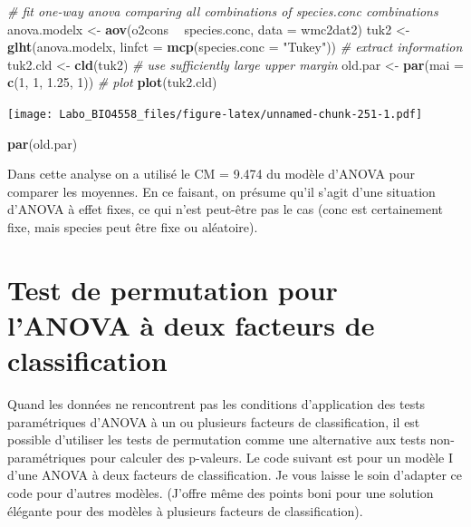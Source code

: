 \documentclass[12pt,]{book}
\newenvironment{Shaded}{\begin{snugshade}}{\end{snugshade}}
\newcommand{\CommentTok}[1]{\textcolor[rgb]{0.56,0.35,0.01}{\textit{#1}}}
\newcommand{\DataTypeTok}[1]{\textcolor[rgb]{0.13,0.29,0.53}{#1}}
\newcommand{\DecValTok}[1]{\textcolor[rgb]{0.00,0.00,0.81}{#1}}
\newcommand{\FloatTok}[1]{\textcolor[rgb]{0.00,0.00,0.81}{#1}}
\newcommand{\KeywordTok}[1]{\textcolor[rgb]{0.13,0.29,0.53}{\textbf{#1}}}
\newcommand{\NormalTok}[1]{#1}
\newcommand{\OperatorTok}[1]{\textcolor[rgb]{0.81,0.36,0.00}{\textbf{#1}}}
\newcommand{\StringTok}[1]{\textcolor[rgb]{0.31,0.60,0.02}{#1}}
\begin{document}
\begin{Shaded}
\begin{Highlighting}[]
\CommentTok{# fit one-way anova comparing all combinations of species.conc combinations}
\NormalTok{anova.modelx <-}\StringTok{ }\KeywordTok{aov}\NormalTok{(o2cons }\OperatorTok{~}\StringTok{ }\NormalTok{species.conc, }\DataTypeTok{data =}\NormalTok{ wmc2dat2)}
\NormalTok{tuk2 <-}\StringTok{ }\KeywordTok{glht}\NormalTok{(anova.modelx, }\DataTypeTok{linfct =} \KeywordTok{mcp}\NormalTok{(}\DataTypeTok{species.conc =} \StringTok{"Tukey"}\NormalTok{))}
\CommentTok{# extract information}
\NormalTok{tuk2.cld <-}\StringTok{ }\KeywordTok{cld}\NormalTok{(tuk2)}
\CommentTok{# use sufficiently large upper margin}
\NormalTok{old.par <-}\StringTok{ }\KeywordTok{par}\NormalTok{(}\DataTypeTok{mai =} \KeywordTok{c}\NormalTok{(}\DecValTok{1}\NormalTok{, }\DecValTok{1}\NormalTok{, }\FloatTok{1.25}\NormalTok{, }\DecValTok{1}\NormalTok{))}
\CommentTok{# plot}
\KeywordTok{plot}\NormalTok{(tuk2.cld)}
\end{Highlighting}
\end{Shaded}

\texttt{[image: Labo\_BIO4558\_files/figure-latex/unnamed-chunk-251-1.pdf]}

\begin{Shaded}
\begin{Highlighting}[]
\KeywordTok{par}\NormalTok{(old.par)}
\end{Highlighting}
\end{Shaded}

Dans cette analyse on a utilisé le CM = 9.474 du modèle d'ANOVA pour comparer les moyennes. En ce faisant, on présume qu'il s'agit d'une situation d'ANOVA à effet fixes, ce qui n'est peut-être pas le cas (conc est certainement fixe, mais species peut être fixe ou aléatoire).

\hypertarget{test-de-permutation-pour-lanova-uxe0-deux-facteurs-de-classification}{%
\section{Test de permutation pour l'ANOVA à deux facteurs de classification}\label{test-de-permutation-pour-lanova-uxe0-deux-facteurs-de-classification}}

Quand les données ne rencontrent pas les conditions d'application des tests paramétriques d'ANOVA à un ou plusieurs facteurs de classification, il est possible d'utiliser les tests de permutation comme une alternative aux tests non-paramétriques pour calculer des p-valeurs. Le code suivant est pour un modèle I d'une ANOVA à deux facteurs de classification. Je vous laisse le soin d'adapter ce code pour d'autres modèles. (J'offre même des points boni pour une solution élégante pour des modèles à plusieurs facteurs de classification).
\end{document}
